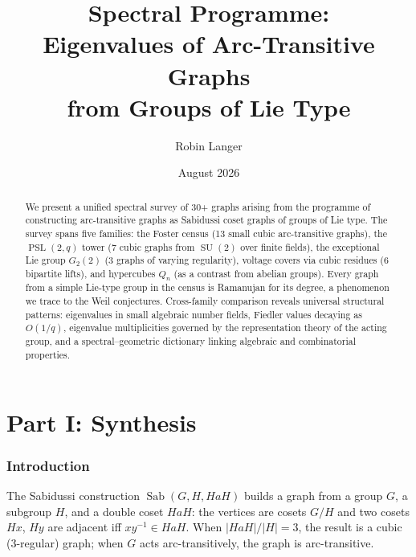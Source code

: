\documentclass[11pt,a4paper]{article}
\title{\textbf{Spectral Programme:\\
  Eigenvalues of Arc-Transitive Graphs\\
  from Groups of Lie Type}}
\author{Robin Langer}
\date{August 2026}
\theoremstyle{plain}
\theoremstyle{definition}
\theoremstyle{remark}
\newcommand{\PSL}{\operatorname{PSL}}
\newcommand{\SU}{\operatorname{SU}}
\newcommand{\Sab}{\operatorname{Sab}}
\begin{document}
\maketitle

\begin{abstract}
We present a unified spectral survey of 30+ graphs arising from the
programme of constructing arc-transitive graphs as Sabidussi
coset graphs of groups of Lie type. The survey spans five families:
the Foster census (13 small cubic arc-transitive graphs), the
$\PSL(2,q)$ tower (7 cubic graphs from $\SU(2)$ over finite fields),
the exceptional Lie group $G_2(2)$ (3 graphs of varying regularity),
voltage covers via cubic residues (6 bipartite lifts),
and hypercubes $Q_n$ (as a contrast from abelian groups).
Every graph from a simple Lie-type group in the census is Ramanujan
for its degree, a phenomenon we trace to the Weil conjectures.
Cross-family comparison reveals universal structural patterns:
eigenvalues in small algebraic number fields,
Fiedler values decaying as $O(1/q)$, eigenvalue multiplicities
governed by the representation theory of the acting group,
and a spectral--geometric dictionary linking algebraic and
combinatorial properties.
\end{abstract}

\tableofcontents

\bigskip

%
%

\part*{Part I: Synthesis}

\section{Introduction}

The Sabidussi construction $\Sab(G, H, HaH)$ builds a graph from a group
$G$, a subgroup $H$, and a double coset $HaH$: the vertices are cosets
$G/H$ and two cosets $Hx$, $Hy$ are adjacent iff $xy^{-1} \in HaH$. When
$|HaH|/|H| = 3$, the result is a cubic (3-regular) graph; when $G$ acts
arc-transitively, the graph is arc-transitive.
\end{document}
